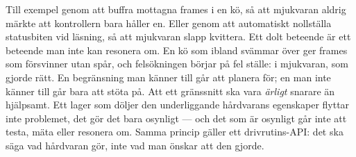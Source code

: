  Till exempel genom att buffra mottagna frames i en kö, så att mjukvaran aldrig märkte att
kontrollern bara håller en. Eller genom att automatiskt nollställa statusbiten vid läsning, så
att mjukvaran slapp kvittera.
 Ett dolt beteende är ett beteende man inte kan resonera om. En kö som ibland svämmar över
ger frames som försvinner utan spår, och felsökningen börjar på fel ställe: i mjukvaran, som
gjorde rätt. En begränsning man känner till går att planera för; en man inte känner till går
bara att stöta på.
 Att ett gränssnitt ska vara \emph{ärligt} snarare än hjälpsamt. Ett lager som döljer
den underliggande hårdvarans egenskaper flyttar inte problemet, det gör det bara osynligt --- och
det som är osynligt går inte att testa, mäta eller resonera om. Samma princip gäller ett
drivrutins-API: det ska säga vad hårdvaran gör, inte vad man önskar att den gjorde.
